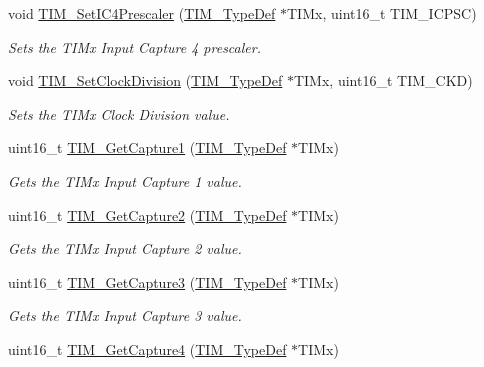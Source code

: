 \begin{DoxyCompactItemize}
void \mbox{\hyperlink{group___t_i_m___exported___functions_ga0f2c784271356d6b64b8c0da64dbdbc2}{T\+I\+M\+\_\+\+Set\+I\+C4\+Prescaler}} (\mbox{\hyperlink{struct_t_i_m___type_def}{T\+I\+M\+\_\+\+Type\+Def}} $\ast$T\+I\+Mx, uint16\+\_\+t T\+I\+M\+\_\+\+I\+C\+P\+SC)
\begin{DoxyCompactList}\small\item\em Sets the T\+I\+Mx Input Capture 4 prescaler. \end{DoxyCompactList}\item 
void \mbox{\hyperlink{group___t_i_m___exported___functions_ga20ef804dc32c723662d11ee7da3baab2}{T\+I\+M\+\_\+\+Set\+Clock\+Division}} (\mbox{\hyperlink{struct_t_i_m___type_def}{T\+I\+M\+\_\+\+Type\+Def}} $\ast$T\+I\+Mx, uint16\+\_\+t T\+I\+M\+\_\+\+C\+KD)
\begin{DoxyCompactList}\small\item\em Sets the T\+I\+Mx Clock Division value. \end{DoxyCompactList}\item 
uint16\+\_\+t \mbox{\hyperlink{group___t_i_m___exported___functions_ga29eb9f7151ceea94c3988539a5ee91cf}{T\+I\+M\+\_\+\+Get\+Capture1}} (\mbox{\hyperlink{struct_t_i_m___type_def}{T\+I\+M\+\_\+\+Type\+Def}} $\ast$T\+I\+Mx)
\begin{DoxyCompactList}\small\item\em Gets the T\+I\+Mx Input Capture 1 value. \end{DoxyCompactList}\item 
uint16\+\_\+t \mbox{\hyperlink{group___t_i_m___exported___functions_ga437fcf00ee9d0a9df9150cc120efc5ad}{T\+I\+M\+\_\+\+Get\+Capture2}} (\mbox{\hyperlink{struct_t_i_m___type_def}{T\+I\+M\+\_\+\+Type\+Def}} $\ast$T\+I\+Mx)
\begin{DoxyCompactList}\small\item\em Gets the T\+I\+Mx Input Capture 2 value. \end{DoxyCompactList}\item 
uint16\+\_\+t \mbox{\hyperlink{group___t_i_m___exported___functions_gab71d1d3d8a15f3be9e74dca51fcca5fa}{T\+I\+M\+\_\+\+Get\+Capture3}} (\mbox{\hyperlink{struct_t_i_m___type_def}{T\+I\+M\+\_\+\+Type\+Def}} $\ast$T\+I\+Mx)
\begin{DoxyCompactList}\small\item\em Gets the T\+I\+Mx Input Capture 3 value. \end{DoxyCompactList}\item 
uint16\+\_\+t \mbox{\hyperlink{group___t_i_m___exported___functions_ga09049af04c8345849c6f82ccfae242a6}{T\+I\+M\+\_\+\+Get\+Capture4}} (\mbox{\hyperlink{struct_t_i_m___type_def}{T\+I\+M\+\_\+\+Type\+Def}} $\ast$T\+I\+Mx)

\end{DoxyCompactItemize}
